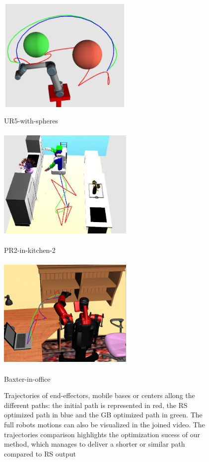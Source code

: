 \documentclass{tADR2e}
\begin{document}
\begin{figure}[ht]
\begin{minipage}[b]{0.5\linewidth}
  \end{minipage}%
  \begin{minipage}[b]{0.5\linewidth}
    \centering
    \includegraphics[width=6.5cm,height=5.5cm]{ur5-spheres_orth_constr_results.png}
    \caption*{UR5-with-spheres}
    \vspace{1ex}
  \end{minipage}
  \begin{minipage}[b]{0.5\linewidth}
    \centering
    \includegraphics[width=6.5cm,height=5.5cm]{pr2_kitchen2_orth_constr_results.png}
    \caption*{PR2-in-kitchen-2}
  \end{minipage}%
  \begin{minipage}[b]{0.5\linewidth}
    \centering
    \includegraphics[width=6.5cm,height=5.5cm]{baxter_orth_constr_results.png}
    \caption*{Baxter-in-office}
  \end{minipage}
  \caption{Trajectories of end-effectors, mobile bases or centers allong the 
  different paths: the initial path is represented in red, the RS optimized path in 
  blue and the GB optimized path in green. The full robots 
  motions can also be visualized in the joined video. The trajectories comparison 
  highlights the optimization sucess of our method, which manages to deliver a 
  shorter or similar path compared to RS output}
  \label{fig:trajectories}
\end{figure}
\end{document}
